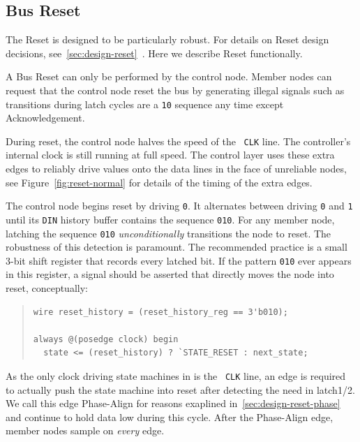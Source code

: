\subsection{Bus Reset}
\label{sec:protocol-reset}
The \bus Reset is designed to be particularly robust. For details on Reset
design decisions, see~\ref{sec:design-reset}~. Here
we describe Reset functionally.

A Bus Reset can only be performed by the control node. Member nodes can
request that the control node reset the bus by generating illegal signals such
as transitions during {\sc latch} cycles are a {\tt 10} sequence any time
except Acknowledgement.

During reset, the control node halves the speed of the \bus~{\tt CLK} line.
The controller's internal clock is still running at full speed. The control
layer uses these extra edges to reliably drive values onto the data lines in
the face of unreliable nodes, see Figure~\ref{fig:reset-normal} for details of
the timing of the extra edges.

The control node begins reset by driving {\tt 0}. It alternates between
driving {\tt 0} and {\tt 1} until its {\tt DIN} history buffer contains the
sequence {\tt 010}. For any member node, latching the sequence {\tt 010} {\em
unconditionally} transitions the node to {\sc reset}. The robustness of this
detection is paramount. The recommended practice is a small 3-bit shift
register that records every latched bit. If the pattern {\tt 010} ever appears
in this register, a signal should be asserted that directly moves the node
into {\sc reset}, conceptually:

\begin{quote}
\begin{lstlisting}
wire reset_history = (reset_history_reg == 3'b010);

always @(posedge clock) begin
  state <= (reset_history) ? `STATE_RESET : next_state;
\end{lstlisting}
\end{quote}

As the only clock driving state machines in \bus is the \bus~{\tt CLK} line,
an edge is required to actually push the state machine into {\sc reset} after
detecting the need in {\sc latch1/2}. We call this edge Phase-Align for reasons
exaplined in~\ref{sec:design-reset-phase}~ and
continue to hold data low during this cycle. After the Phase-Align edge,
member nodes sample on {\em every} edge.

